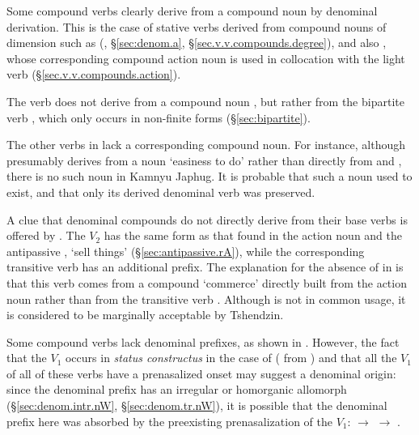 Some compound verbs clearly derive from a compound noun by denominal derivation. This is the case of stative verbs derived from compound nouns of dimension such as  (, §\ref{sec:denom.a}, §\ref{sec.v.v.compounds.degree}), and also  , whose corresponding compound action noun  is used in collocation with the light verb  (§\ref{sec.v.v.compounds.action}).

The verb  does not derive from a compound noun , but rather from the bipartite verb , which only occurs in non-finite forms (§\ref{sec:bipartite}).

The other verbs in  lack a corresponding compound noun. For instance, although  presumably derives from a noun  `easiness to do' rather than directly from  and , there is no such noun in Kamnyu Japhug. It is probable that such a noun used to exist, and that only its derived denominal verb was preserved. 

A clue that denominal compounds do not directly derive from their base verbs is offered by . The $V_2$  has the same form as that found in the action noun  and the antipassive , `sell things' (§\ref{sec:antipassive.rA}), while the corresponding transitive verb  has an additional  prefix. The explanation for the absence of  in  is that this verb comes from a compound  `commerce' directly built from the action noun  rather than from the transitive verb . Although  is not in common usage, it is considered to be marginally acceptable by Tshendzin.

Some compound verbs lack denominal prefixes, as shown in . However, the fact that the $V_1$ occurs in \textit{status constructus} in the case of  ( from ) and that all the $V_1$ of all of these verbs have a prenasalized onset may suggest a denominal origin: since the denominal  prefix has an irregular  or homorganic  allomorph (§\ref{sec:denom.intr.nW}, §\ref{sec:denom.tr.nW}), it is possible that the denominal prefix here was absorbed by the preexisting prenasalization of the $V_1$:  $\rightarrow$  $\rightarrow$ .

